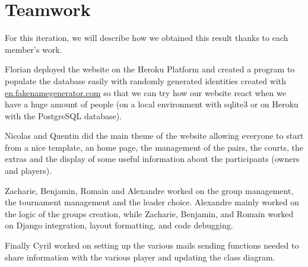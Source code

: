 \section{Teamwork}

For this iteration, we will describe how we obtained this result thanks to
each member's work. \newline

Florian deployed the website on the Heroku Platform and created a program
to populate the database easily with randomly generated identities created
with \url{en.fakenamegenerator.com} so that we can try how our website react
when we have a huge amount of people (on a local environment with sqlite3
or on Heroku with the PostgreSQL database). \newline

Nicolas and Quentin did the main theme of the website allowing everyone to
start from a nice template, an home page, the management of the pairs, the
courts, the extras and the display of some useful information about the
participants (owners and players). \newline

Zacharie, Benjamin, Romain and Alexandre worked on the group management,
the tournament management and the leader choice. Alexandre mainly worked on the logic of the groups creation, while Zacharie, Benjamin, and Romain worked on Django integration, layout formatting, and code debugging. \newline

Finally Cyril worked on setting up the various mails sending functions needed to share information with the various player and updating the class diagram.
